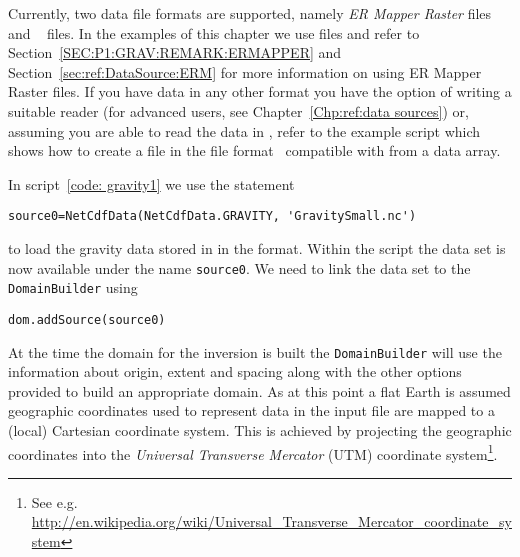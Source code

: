 Currently, two data file formats are supported, namely \emph{ER Mapper Raster}
\cite{ERMAPPER} files and \netcdf~\cite{NETCDF} files.
In the examples of this chapter we use \netcdf files and refer to
Section~\ref{SEC:P1:GRAV:REMARK:ERMAPPER} and
Section~\ref{sec:ref:DataSource:ERM} for more information on using ER Mapper
Raster files.
If you have data in any other format you have the option of writing a suitable
reader (for advanced users, see Chapter~\ref{Chp:ref:data sources}) or,
assuming you are able to read the data in \Python, refer to the example
script  which shows how to create a file
in the \netcdf file format~\cite{NETCDF} compatible with \downunder from
a data array.

In script~\ref{code: gravity1} we use the statement 
\begin{verbatim}
source0=NetCdfData(NetCdfData.GRAVITY, 'GravitySmall.nc')
\end{verbatim}
to load the gravity data stored in  in the
\netcdf format. 
Within the script the data set is now available under the name \verb|source0|.
We need to link the data set to the \verb|DomainBuilder| using 
\begin{verbatim}
dom.addSource(source0)
\end{verbatim}
At the time the domain for the inversion is built the \verb|DomainBuilder|
will use the information about origin, extent and spacing along with the other
options provided to build an appropriate domain.
As at this point a flat Earth is assumed geographic coordinates used to
represent data in the input file are mapped to a (local) Cartesian coordinate
system. This is achieved by projecting the geographic coordinates into the
\emph{Universal Transverse Mercator} (UTM) coordinate system\footnote{See e.g.
\url{http://en.wikipedia.org/wiki/Universal_Transverse_Mercator_coordinate_system}}.

